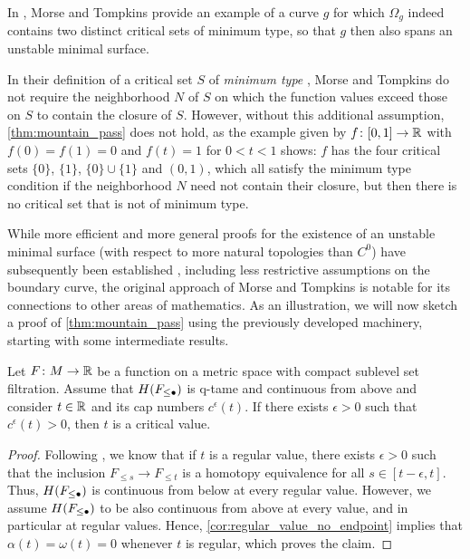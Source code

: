 In \cite[Section 8]{Morse.1939}, Morse and Tompkins provide an example of a curve $g$ for which $\Omega_{g}$ indeed contains two distinct critical sets of minimum type, so that $g$ then also spans an unstable minimal surface.

\begin{rem}
	In their definition of a critical set $S$ of \emph{minimum type} \cite[p.~472]{Morse.1939}, Morse and Tompkins do not require the neighborhood $N$ of $S$ on which the function values exceed those on $S$ to contain the closure of $S$.
	However, without this additional assumption, \cref{thm:mountain_pass} does not hold, as the example given by $f \colon [0,1] \to \mathbb{R}$ with $f(0) = f(1) = 0$ and $f(t) = 1$ for $0 < t < 1$ shows:
	$f$ has the four critical sets $\{0\}$, $\{1\}$, $\{0\} \cup \{1\}$ and $(0,1)$, which all satisfy the minimum type condition if the neighborhood $N$ need not contain their closure, but then there is no critical set that is not of minimum type.
\end{rem}

While more efficient and more general proofs for the existence of an unstable minimal surface (with respect to more natural topologies than $C^0$) have subsequently been established \cite{Struwe.1988,Dierkes.2010}, including less restrictive assumptions on the boundary curve, the original approach of Morse and Tompkins is notable
for its connections to other areas of mathematics.
As an illustration, we will now sketch a proof of \cref{thm:mountain_pass} using the previously developed machinery, starting with some intermediate results.

\begin{lem}
\label{lem:endpoint_implies_crit_pt}
	Let $F \colon M \to \mathbb{R}$ be a function on a metric space with compact sublevel set filtration.
	Assume that $H(F_{\leq \bullet})$ is q-tame and continuous from above and consider $t \in \mathbb{R}$ and its cap numbers $c^{\epsilon}(t)$.
	If there exists $\epsilon > 0$ such that $c^{\epsilon}(t) > 0$, then $t$ is a critical value.
\end{lem}
\begin{proof}
	Following \cite[Remark II.6.3]{Struwe.1988}, we know that if $t$ is a regular value, there exists $\epsilon > 0$ such that the inclusion $F_{\leq s} \to F_{\leq t}$ is a homotopy equivalence for all $s \in [t - \epsilon, t]$.
	Thus, $H(F_{\leq \bullet})$ is continuous from below at every regular value.
	However, we assume $H(F_{\leq \bullet})$ to be also continuous from above at every value, and in particular at regular values.
	Hence, \cref{cor:regular_value_no_endpoint} implies that $\alpha(t) = \omega(t) = 0$ whenever $t$ is regular, which proves the claim.
\end{proof}

